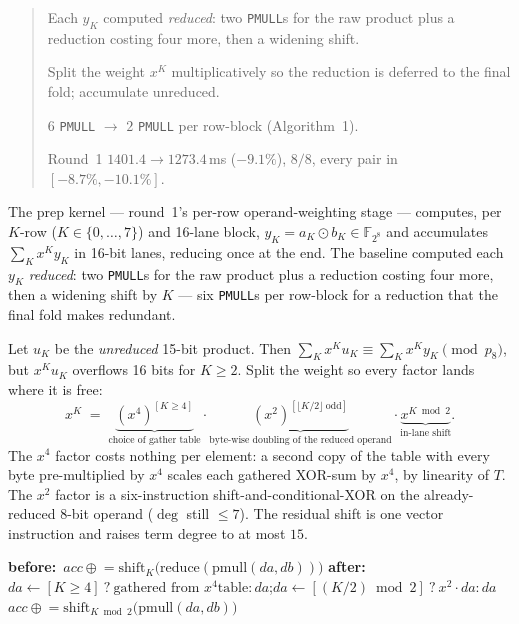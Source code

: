 \documentclass[11pt]{article}
\newcommand{\Feight}{\mathbb{F}_{2^8}}
\newcommand{\code}[1]{\texttt{#1}}
\newenvironment{optsummary}{%
  \begin{quote}\small
  \begin{description}
  \setlength{\itemsep}{1pt}\setlength{\parsep}{0pt}\setlength{\topsep}{2pt}
}{%
  \end{description}
  \end{quote}
}
\begin{document}
\begin{optsummary}
\item[Baseline:] Each $y_K$ computed \emph{reduced}: two \code{PMULL}s for the raw product plus a reduction costing four more, then a widening shift.
\item[Improvement:] Split the weight $x^K$ multiplicatively so the reduction is deferred to the final fold; accumulate unreduced.
\item[Mechanism:] $6$ \code{PMULL} $\to$ $2$ \code{PMULL} per row-block (Algorithm~1).
\item[Result:] Round~1 $1401.4\to1273.4\,$ms ($-9.1\%$), $8/8$, every pair in $[-8.7\%,-10.1\%]$.
\end{optsummary}

The prep kernel --- round~1's per-row operand-weighting stage --- computes,
per $K$-row ($K\in\{0,\dots,7\}$) and 16-lane block,
$y_K = a_K \odot b_K \in \Feight$ and accumulates $\sum_K x^K y_K$ in 16-bit
lanes, reducing once at the end. The baseline computed each $y_K$
\emph{reduced}: two \code{PMULL}s for the raw product plus a reduction costing
four more, then a widening shift by $K$ --- six \code{PMULL}s per row-block for
a reduction that the final fold makes redundant.

Let $u_K$ be the \emph{unreduced} 15-bit product. Then
$\sum_K x^K u_K \equiv \sum_K x^K y_K \pmod{p_8}$, but $x^K u_K$ overflows 16
bits for $K\ge2$. Split the weight so every factor lands where it is free:
\[
x^K \;=\;
\underbrace{(x^4)^{[K\ge4]}}_{\text{choice of gather table}}\cdot
\underbrace{(x^2)^{[\lfloor K/2\rfloor\ \mathrm{odd}]}}_{\text{byte-wise
doubling of the reduced operand}}\cdot
\underbrace{x^{K\bmod 2}}_{\text{in-lane shift}}.
\]
The $x^4$ factor costs nothing per element: a second copy of the table with
every byte pre-multiplied by $x^4$ scales each gathered XOR-sum by $x^4$, by
linearity of $T$. The $x^2$ factor is a six-instruction shift-and-conditional-XOR
on the already-reduced 8-bit operand ($\deg$ still $\le7$). The residual shift
is one vector instruction and raises term degree to at most $15$.

\begin{algorithm}[h]
\caption{Row-block accumulate, before and after}
\begin{algorithmic}[1]
\State \textbf{before:}\ $\mathit{acc} \mathrel{\oplus}=
  \mathrm{shift}_K\!\big(\mathrm{reduce}(\mathrm{pmull}(da, db))\big)$
  \Comment{$6$ \code{PMULL}}
\State \textbf{after:}\ \ $da \gets [K\ge4]\ ?\ \text{gathered from }x^4\text{
  table} : da$;\quad $da \gets [(K/2)\bmod 2]\ ?\ x^2\!\cdot\!da : da$
\State {}\ $\mathit{acc} \mathrel{\oplus}=
  \mathrm{shift}_{K\bmod2}\!\big(\mathrm{pmull}(da, db)\big)$
  \Comment{$2$ \code{PMULL}}
\end{algorithmic}
\end{algorithm}
\end{document}
